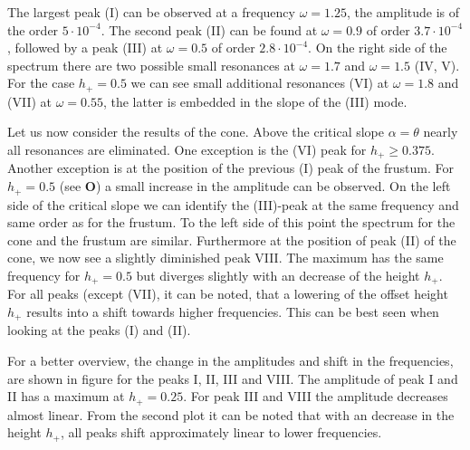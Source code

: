 The largest peak (\RN{1}) can be observed at a frequency $\omega=1.25$, the amplitude is of the order $5\cdot10^{-4}$.
The second peak (\RN{2}) can be found at $\omega=0.9$ of order $3.7\cdot10^{-4}$, followed by
a peak (\RN{3}) at $\omega=0.5$ of order $2.8\cdot10^{-4}$.
On the right side of the spectrum there are two possible small resonances at $\omega=1.7$ and $\omega=1.5$ (\RN{4}, \RN{5}).
For the case $h_+=0.5$  we can see small additional resonances  (\RN{6}) at $\omega=1.8$ and (\RN{7}) at $\omega=0.55$,
the latter is embedded in the slope of the (\RN{3}) mode.

Let us now consider the results of the cone.
Above the critical slope $\alpha=\theta$ nearly all resonances are eliminated. One exception is the (\RN{6}) peak for
$h_+\geq0.375$. Another exception is at the position of the previous (\RN{1}) peak of the frustum.
For $h_+=0.5$ (see \textbf{O}) a small increase in the amplitude can be observed.
On the left side of the critical slope we can identify the (\RN{3})-peak
at the same frequency and same order as for the frustum. To the left side of this point the spectrum for
the cone and the frustum are similar.
Furthermore at the position of peak (\RN{2}) of the cone, we now see a slightly diminished peak \RN{8}.
The maximum has the same frequency for $h_+=0.5$ but diverges slightly with an decrease of the height $h_+$.\\
For all peaks (except (\RN{7}), it can be noted, that a lowering of the offset height $h_+$ results
into a shift towards higher frequencies. This can be best seen when looking at the peaks (\RN{1}) and (\RN{2}).

For a better overview, the change in the amplitudes and shift in the frequencies, are shown in
figure \label{fig:cone:finalampmax} for the peaks \RN{1}, \RN{2}, \RN{3} and \RN{8}.
The amplitude of peak \RN{1} and \RN{2} has a maximum at $h_+= 0.25$. For peak \RN{3} and \RN{8} the amplitude decreases almost linear.
From the second plot it can be noted that with an decrease in the height $h_+$,
all peaks shift approximately linear to lower frequencies.

